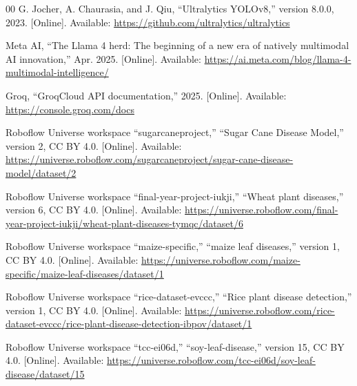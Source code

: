 \documentclass[conference]{IEEEtran}
\begin{document}
\begin{thebibliography}{00}
 G. Jocher, A. Chaurasia, and J. Qiu, ``Ultralytics YOLOv8,'' version 8.0.0, 2023. [Online]. Available: \url{https://github.com/ultralytics/ultralytics}

 Meta AI, ``The Llama 4 herd: The beginning of a new era of natively multimodal AI innovation,'' Apr. 2025. [Online]. Available: \url{https://ai.meta.com/blog/llama-4-multimodal-intelligence/}

 Groq, ``GroqCloud API documentation,'' 2025. [Online]. Available: \url{https://console.groq.com/docs}

 Roboflow Universe workspace ``sugarcaneproject,'' ``Sugar Cane Disease Model,'' version 2, CC BY 4.0. [Online]. Available: \url{https://universe.roboflow.com/sugarcaneproject/sugar-cane-disease-model/dataset/2}

 Roboflow Universe workspace ``final-year-project-iukji,'' ``Wheat plant diseases,'' version 6, CC BY 4.0. [Online]. Available: \url{https://universe.roboflow.com/final-year-project-iukji/wheat-plant-diseases-tymqc/dataset/6}

 Roboflow Universe workspace ``maize-specific,'' ``maize leaf diseases,'' version 1, CC BY 4.0. [Online]. Available: \url{https://universe.roboflow.com/maize-specific/maize-leaf-diseases/dataset/1}

 Roboflow Universe workspace ``rice-dataset-evccc,'' ``Rice plant disease detection,'' version 1, CC BY 4.0. [Online]. Available: \url{https://universe.roboflow.com/rice-dataset-evccc/rice-plant-disease-detection-ibpov/dataset/1}

 Roboflow Universe workspace ``tcc-ei06d,'' ``soy-leaf-disease,'' version 15, CC BY 4.0. [Online]. Available: \url{https://universe.roboflow.com/tcc-ei06d/soy-leaf-disease/dataset/15}

\end{thebibliography}
\end{document}
